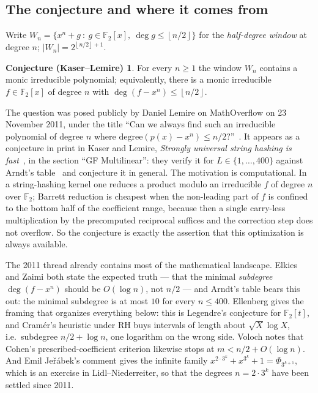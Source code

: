 \documentclass[10pt]{article}
\theoremstyle{plain}
\theoremstyle{definition}
\newtheorem*{conjecturenamed}{Conjecture (Kaser--Lemire)}
\newcommand{\F}{\mathbb F}
\newcommand{\flr}[1]{\left\lfloor #1\right\rfloor}
\begin{document}
\subsection{The conjecture and where it comes from}

Write $W_n=\{x^n+g\ :\ g\in\F_2[x],\ \deg g\le\flr{n/2}\}$ for the
\emph{half-degree window} at degree $n$; $|W_n|=2^{\flr{n/2}+1}$.

\begin{conjecturenamed}
For every $n\ge1$ the window $W_n$ contains a monic irreducible polynomial;
equivalently, there is a monic irreducible $f\in\F_2[x]$ of degree $n$ with
$\deg(f-x^n)\le\flr{n/2}$.
\end{conjecturenamed}

The question was posed publicly by Daniel Lemire on MathOverflow on 23 November
2011, under the title ``Can we always find such an irreducible polynomial of
degree $n$ where $\mathrm{degree}(p(x)-x^n)\le n/2$?''~\cite{MO81717}. It
appears as a conjecture in print in Kaser and Lemire, \emph{Strongly universal
string hashing is fast}~\cite{KL}, in the section ``GF Multilinear'': they
verify it for $L\in\{1,\dots,400\}$ against Arndt's table~\cite{Arndt} and
conjecture it in general. The motivation is computational. In a string-hashing
kernel one reduces a product modulo an irreducible $f$ of degree $n$ over
$\F_2$; Barrett reduction is cheapest when the non-leading part of $f$ is
confined to the bottom half of the coefficient range, because then a single
carry-less multiplication by the precomputed reciprocal suffices and the
correction step does not overflow. So the conjecture is exactly the assertion
that this optimization is always available.

The 2011 thread already contains most of the mathematical landscape.
Elkies and Zaimi both state the expected truth --- that the minimal
\emph{subdegree} $\deg(f-x^n)$ should be $O(\log n)$, not $n/2$ --- and Arndt's
table bears this out: the minimal subdegree is at most $10$ for every
$n\le400$. Ellenberg gives the framing that organizes everything below: this is
Legendre's conjecture for $\F_2[t]$, and Cram\'er's heuristic under RH buys
intervals of length about $\sqrt X\log X$, i.e.\ subdegree $n/2+\log n$, one
logarithm on the wrong side. Voloch notes that Cohen's prescribed-coefficient
criterion likewise stops at $m<n/2+O(\log n)$. And Emil Je\v{r}\'abek's comment
gives the infinite family $x^{2\cdot3^k}+x^{3^k}+1=\Phi_{3^{k+1}}$, which is an
exercise in Lidl--Niederreiter, so that the degrees $n=2\cdot3^k$ have been
settled since 2011.
\end{document}
